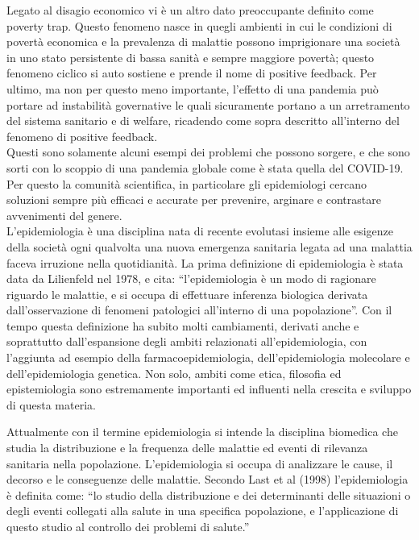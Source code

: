 Legato al disagio economico vi è un altro dato preoccupante definito come poverty trap. 
Questo fenomeno nasce in quegli ambienti in cui le condizioni di povertà economica e 
la prevalenza di malattie possono imprigionare una società in uno stato persistente 
di bassa sanità e sempre maggiore povertà; 
questo fenomeno ciclico si auto sostiene e prende il nome di positive feedback. 
Per ultimo, ma non per questo meno importante, l’effetto di una pandemia può 
portare ad instabilità governative le quali sicuramente portano a un arretramento del 
sistema sanitario e di welfare, ricadendo come sopra descritto all’interno del 
fenomeno di positive feedback.
\\

Questi sono solamente alcuni esempi dei problemi che possono sorgere, 
e che sono sorti con lo scoppio di una pandemia globale come è stata quella del COVID-19. 
Per questo la comunità scientifica, in particolare gli epidemiologi cercano soluzioni sempre 
più efficaci e accurate per prevenire, arginare e contrastare avvenimenti del genere.
\\

L’epidemiologia è una disciplina nata di recente evolutasi insieme alle esigenze della società ogni 
qualvolta una nuova emergenza sanitaria legata ad una malattia faceva irruzione nella quotidianità. 
La prima definizione di epidemiologia è stata data da Lilienfeld nel 1978, e cita: 
“l’epidemiologia è un modo di ragionare riguardo le malattie, e si occupa di effettuare 
inferenza biologica derivata dall’osservazione di fenomeni patologici all’interno di una popolazione”. 
Con il tempo questa definizione ha subito molti cambiamenti, derivati anche e soprattutto 
dall’espansione degli ambiti relazionati all’epidemiologia, 
con l’aggiunta ad esempio della farmacoepidemiologia, dell’epidemiologia molecolare 
e dell’epidemiologia genetica. Non solo, ambiti come etica, filosofia ed epistemiologia sono 
estremamente importanti ed influenti nella crescita e sviluppo di questa materia. 

Attualmente con il termine epidemiologia si intende la disciplina biomedica che studia 
la distribuzione e la frequenza delle malattie ed eventi di rilevanza sanitaria nella popolazione. 
L’epidemiologia si occupa di analizzare le cause, il decorso e le conseguenze delle malattie. 
Secondo Last et al (1998) l’epidemiologia è definita come: 
“lo studio della distribuzione e dei determinanti delle situazioni o 
degli eventi collegati alla salute in una specifica popolazione, 
e l'applicazione di questo studio al controllo dei problemi di salute.”
\\

